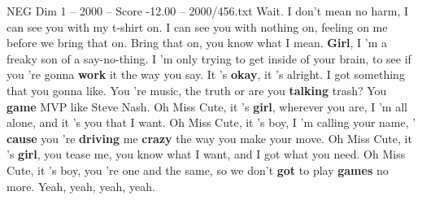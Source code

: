 \begin{textsample}{NEG Dim 1 – 2000 – Score -12.00 – 2000/456.txt}
Wait.
I don't mean no harm, I can see you with my t-shirt on.
I can see you with nothing on, feeling on me before we bring that on.
Bring that on, you know what I mean. \textbf{Girl}, I 'm a freaky son of a say-no-thing.
I 'm only trying to get inside of your brain, to see if you 're gonna \textbf{work} it the way you say.
It 's \textbf{okay}, it 's alright.
I got something that you gonna like.
You 're music, the truth or are you \textbf{talking} trash?
You \textbf{game} MVP like Steve Nash.
Oh Miss Cute, it 's \textbf{girl}, wherever you are, I 'm all alone, and it 's you that I want.
Oh Miss Cute, it 's boy, I 'm calling your name, ' \textbf{cause} you 're \textbf{driving} me \textbf{crazy} the way you make your move.
Oh Miss Cute, it 's \textbf{girl}, you tease me, you know what I want, and I got what you need.
Oh Miss Cute, it 's boy, you 're one and the same, so we don't \textbf{got} to play \textbf{games} no more.
Yeah, yeah, yeah, yeah.

\end{textsample}
